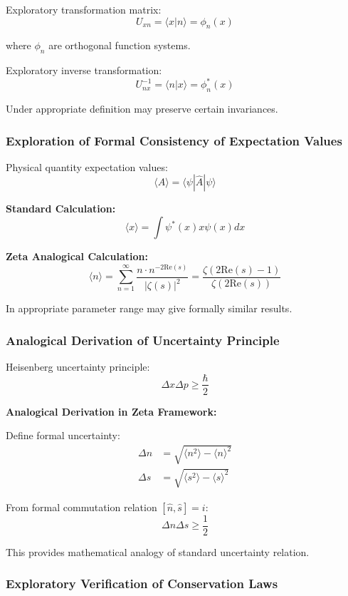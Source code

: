 \documentclass[11pt]{article}
\theoremstyle{plain}
\theoremstyle{definition}
\theoremstyle{remark}
\begin{document}
Exploratory transformation matrix:
$$U_{xn} = \langle x|n\rangle = \phi_n(x)$$

where $\phi_n$ are orthogonal function systems.

Exploratory inverse transformation:
$$U^{-1}_{nx} = \langle n|x\rangle = \phi_n^*(x)$$

Under appropriate definition may preserve certain invariances.

\subsubsection{Exploration of Formal Consistency of Expectation Values}

Physical quantity expectation values:
$$\langle A \rangle = \langle \psi|\hat{A}|\psi\rangle$$

\textbf{Standard Calculation:}
$$\langle x \rangle = \int \psi^*(x) x \psi(x) dx$$

\textbf{Zeta Analogical Calculation:}
$$\langle n \rangle = \sum_{n=1}^{\infty} \frac{n \cdot n^{-2\text{Re}(s)}}{|\zeta(s)|^2} = \frac{\zeta(2\text{Re}(s)-1)}{\zeta(2\text{Re}(s))}$$

In appropriate parameter range may give formally similar results.

\subsubsection{Analogical Derivation of Uncertainty Principle}

Heisenberg uncertainty principle:
$$\Delta x \Delta p \geq \frac{\hbar}{2}$$

\textbf{Analogical Derivation in Zeta Framework:}

Define formal uncertainty:
\begin{align}
\Delta n &= \sqrt{\langle n^2 \rangle - \langle n \rangle^2} \\
\Delta s &= \sqrt{\langle s^2 \rangle - \langle s \rangle^2}
\end{align}

From formal commutation relation $[\hat{n}, \hat{s}] = i$:
$$\Delta n \Delta s \geq \frac{1}{2}$$

This provides mathematical analogy of standard uncertainty relation.

\subsubsection{Exploratory Verification of Conservation Laws}
\end{document}
